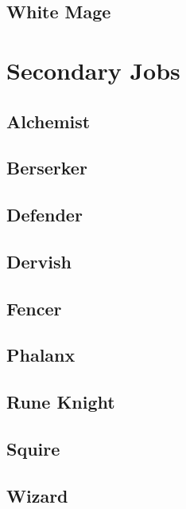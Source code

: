 \subsection{White Mage}


\section{Secondary Jobs}
\label{sec:jobs-sjob}

\subsection{Alchemist}


\subsection{Berserker}


\subsection{Defender}


\subsection{Dervish}


\subsection{Fencer}


\subsection{Phalanx}


\subsection{Rune Knight}


\subsection{Squire}


\subsection{Wizard}

